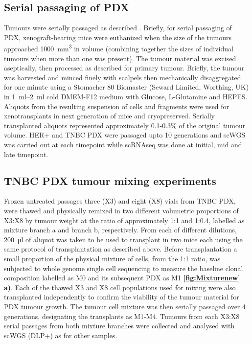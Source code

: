 \subsection{Serial passaging of PDX}
Tumours were serially passaged as  described \cite{eirew2015dynamics}.
Briefly, for serial passaging of PDX, xenograft-bearing mice were euthanized when the size of the tumours approached \SI{1000}{\mm\cubed} in volume (combining together the sizes of individual tumours when more than one was present).
The tumour material was excised aseptically, then processed as described for primary tumour. 
Briefly, the tumour was harvested and minced finely with scalpels then mechanically disaggregated for one minute using a Stomacher 80 Biomaster (Seward Limited, Worthing, UK) in \SIrange{1}{2}{\ml} cold DMEM-F12 medium with Glucose, L-Glutamine and HEPES. 
Aliquots from the resulting suspension of cells and fragments were used for xenotransplants in next generation of mice and cryopreserved.
Serially transplanted aliquots represented approximately 0.1-0.3\%  of the original tumour volume. HER+ and TNBC PDX were passaged upto 10 generations and scWGS was carried out at each timepoint while scRNAseq was done at initial, mid and late timepoint. 

\subsection{TNBC PDX tumour mixing experiments} Frozen untreated passages three (X3) and eight (X8) vials from TNBC PDX, were thawed and  physically remixed in two different volumetric proportions of X3:X8 by tumour weight at the ratio of approximately 1:1 and 1:0.4, labelled as mixture branch a and branch b, respectively. From each of different dilutions, \SI{200}{\ul} of aliquot was taken to be used to transplant in two mice each using the same protocol of transplantation as described above. Before transplantation a small proportion of the physical mixture of cells, from the 1:1 ratio, was subjected to whole genome single cell sequencing to measure the baseline clonal composition labelled as M0 and its subsequent PDX as M1 \textbf{\autoref{fig:Mixturenew} a)}. Each of the thawed X3 and X8 cell populations used for mixing were also transplanted independently to confirm the viability of the tumour material for PDX tumour growth. The tumour cell mixture was then serially passaged over 4 generations, designating the transplants as M1-M4. Tumours from each X3:X8 serial passages from both mixture branches were collected and analysed with scWGS (DLP+) as for other samples.

